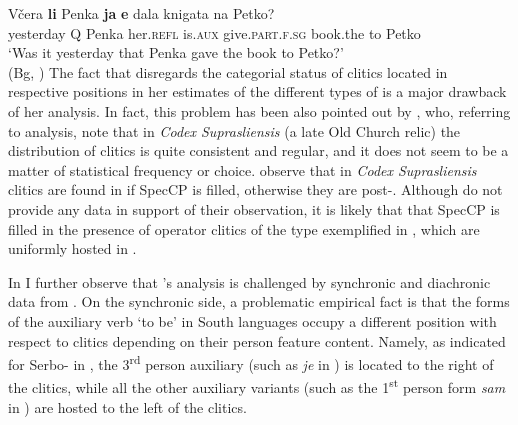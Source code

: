 \documentclass[output=paper,modfonts,newtxmath,hidelinks]{langscibook}
\begin{document}
\ea \label{11:ex10}
	\gll Včera \textbf{li} Penka \textbf{ja} \textbf{e}  dala knigata na Petko?\\
     	 yesterday Q Penka her.\textsc{refl} is\textsubscript{}.\textsc{aux} give.\textsc{part.f.sg} book.the to Petko \\
	\glt `Was it yesterday that Penka gave the book to Petko?'\\{}\hfill (Bg, \citealt[833]{tomic1996})
\z
The fact that \citet{pancheva2005} disregards the categorial status of clitics located in respective positions in her estimates of the different types of  is a major drawback of her analysis. In fact, this problem has been also pointed out by \citet{dimitrovavulchanova-vulchanov2008}, who, referring to  analysis, note that in \textit{Codex Suprasliensis} (a late Old Church  relic) the distribution of clitics is quite consistent and regular, and it does not seem to be a matter of statistical frequency or choice. \citeauthor{dimitrovavulchanova-vulchanov2008} observe that in \textit{Codex Suprasliensis} clitics are found in  if SpecCP is filled, otherwise they are post-. Although \citeauthor{dimitrovavulchanova-vulchanov2008} do not provide any data in support of their observation, it is likely that that SpecCP is filled in the presence of operator clitics of the type exemplified in , which are uniformly hosted in . 

In \citet{migdalski2016} I further observe that \citeauthor{pancheva2005}’s analysis is challenged by synchronic and diachronic  data from . On the synchronic side, a problematic empirical fact is that the  forms of the auxiliary verb ‘to be’ in South  languages occupy a different position with respect to  clitics depending on their person feature content. Namely, as indicated for Serbo- in , the 3\textsuperscript{rd} person auxiliary  (such as \textit{je} in ) is located to the right of the  clitics, while all the other auxiliary variants (such as the 1\textsuperscript{st} person form \textit{sam} in ) are hosted to the left of the  clitics. 
\end{document}
